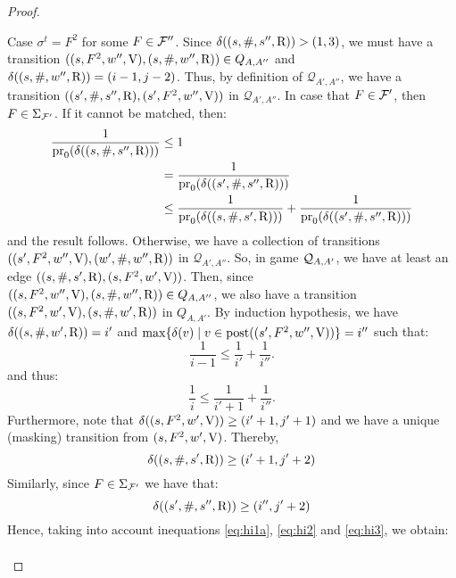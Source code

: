 \begin{proof}
\begin{description}
  Case $\sigma^t = F^2$ for some $F \in \mathcal{F}''$. Since $\delta((s, \#, s'', \mathrm{R})) > (1,3)$,
we must have a transition $((s, F^2, w'', \mathrm{V}), (s, \#, w'', \mathrm{R})) \in Q_{A,A''}$ and $\delta((s, \#, w'', \mathrm{R})) = (i-1,j-2)$. 
Thus, by definition of $\mathcal{Q}_{A',A''}$, we have a transition 
$((s', \#, s'', \mathrm{R}), (s', F^2, w'', \mathrm{V}))$ in $\mathcal{Q}_{A',A''}$. 
In case that $F \in \mathcal{F}'$, then $F \in \Sigma_{\mathcal{F}'}$. 
If it cannot be matched, then:
\begin{align*}
\frac{1}{\operatorname{pr}_{0}(\delta((s,\#, s'', \mathrm{R})))}  & \leq 1	\\
							     &= \frac{1}{\operatorname{pr}_{0}(\delta((s', \#, s'', \mathrm{R})))}  \\
							     &\leq  \frac{1}{\operatorname{pr}_{0}(\delta((s, \#, s', \mathrm{R})))} +  \frac{1}{\operatorname{pr}_{0}(\delta((s', \#, s'', \mathrm{R})))}   
\end{align*}
and the result follows.  Otherwise, we have a collection of transitions  $((s', F^2, w'', \mathrm{V}), (w', \#, w'', \mathrm{R}))$ in $\mathcal{Q}_{A',A''}$. 
So, in game $\mathcal{Q}_{A, A'}$, we have at least an edge $((s, \#, s', \mathrm{R}), (s, F^2, w', \mathrm{V}))$. 
Then, since $((s, F^2, w'', \mathrm{V}), (s, \#, w'', \mathrm{R})) \in Q_{A,A''}$, we also have  a transition $((s, F^2, w', \mathrm{V}), (s, \#, w', \mathrm{R}))$ in $Q_{A,A'}$. 
By induction hypothesis, we have $\delta((s, \#, w', \mathrm{R}))= i'$ and $\max \{ \delta(v) \mid v \in \operatorname{post}((s', F^2, w'', \mathrm{V})) \}=i''$ such that:
\begin{equation}\label{eq:hi1}
\frac{1}{i-1} \leq \frac{1}{i'} + \frac{1}{i''}.
\end{equation} 
and thus:
\begin{equation}\label{eq:hi1a}
\frac{1}{i} \leq \frac{1}{i'+1} + \frac{1}{i''}.
\end{equation}
Furthermore, note that $\delta((s, F^2, w', \mathrm{V})) \geq (i'+1,j'+1)$ and we have a unique (masking) transition from $(s, F^2, w', \mathrm{V})$. 
Thereby, 
\begin{equation}\label{eq:hi2}
	\delta((s, \#, s', \mathrm{R})) \geq (i'+1,j'+2)
\end{equation}
Similarly, since $F \in \Sigma_{\mathcal{F}'}$ we have that:
\begin{equation}\label{eq:hi3}
	\delta((s', \#, s'', \mathrm{R})) \geq (i'',j'+2)
\end{equation}
Hence, taking into account inequations \ref{eq:hi1a}, \ref{eq:hi2} and \ref{eq:hi3}, we 
obtain:
\begin{align*}

\end{align*}
\end{description}
\end{proof}
